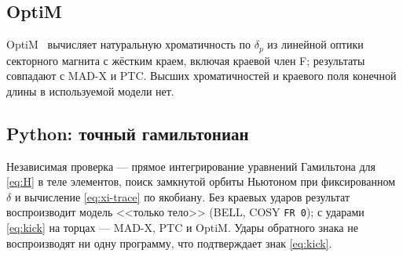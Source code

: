 \subsection{OptiM}

OptiM~\cite{OptiM} вычисляет натуральную хроматичность по $\delta_p$ из линейной оптики секторного магнита с жёстким краем, включая краевой член F; результаты совпадают с MAD-X и PTC. Высших хроматичностей и краевого поля конечной длины в используемой модели нет.

\subsection{Python: точный гамильтониан}

Независимая проверка --- прямое интегрирование уравнений Гамильтона для \eqref{eq:H} в теле элементов, поиск замкнутой орбиты Ньютоном при фиксированном $\delta$ и вычисление \eqref{eq:xi-trace} по якобиану. Без краевых ударов результат воспроизводит модель <<только тело>> (BELL, COSY \texttt{FR 0}); с ударами \eqref{eq:kick} на торцах --- MAD-X, PTC и OptiM. Удары обратного знака не воспроизводят ни одну программу, что подтверждает знак \eqref{eq:kick}.
